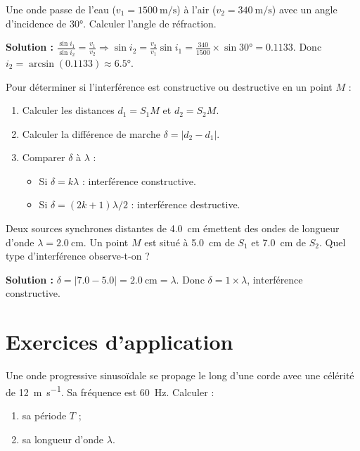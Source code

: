 \begin{exemple}
Une onde passe de l'eau ($v_1 = \SI{1500}{\metre\per\second}$) à l'air ($v_2 = \SI{340}{\metre\per\second}$) avec un angle d'incidence de \ang{30}. Calculer l'angle de réfraction.
\medskip

\textbf{Solution :} $\frac{\sin i_1}{\sin i_2} = \frac{v_1}{v_2} \Rightarrow \sin i_2 = \frac{v_2}{v_1} \sin i_1 = \frac{340}{1500} \times \sin\ang{30} = 0.1133$. Donc $i_2 = \arcsin(0.1133) \approx \ang{6.5}$.
\end{exemple}

Pour déterminer si l'interférence est constructive ou destructive en un point $M$ :
\begin{enumerate}
    \item Calculer les distances $d_1 = S_1M$ et $d_2 = S_2M$.
    \item Calculer la différence de marche $\delta = |d_2 - d_1|$.
    \item Comparer $\delta$ à $\lambda$ :
    \begin{itemize}
        \item Si $\delta = k\lambda$ : interférence constructive.
        \item Si $\delta = (2k+1)\lambda/2$ : interférence destructive.
    \end{itemize}
\end{enumerate}

\begin{exemple}
Deux sources synchrones distantes de \SI{4.0}{\centi\metre} émettent des ondes de longueur d'onde $\lambda = \SI{2.0}{\centi\metre}$. Un point $M$ est situé à \SI{5.0}{\centi\metre} de $S_1$ et \SI{7.0}{\centi\metre} de $S_2$. Quel type d'interférence observe-t-on ?
\medskip

\textbf{Solution :} $\delta = |7.0 - 5.0| = \SI{2.0}{\centi\metre} = \lambda$. Donc $\delta = 1 \times \lambda$, interférence constructive.
\end{exemple}

\section{Exercices d'application}


\exo{} Une onde progressive sinusoïdale se propage le long d'une corde avec une célérité de \SI{12}{\metre\per\second}. Sa fréquence est \SI{60}{\hertz}. Calculer :
\begin{enumerate}
    \item sa période $T$ ;
    \item sa longueur d'onde $\lambda$.
\end{enumerate}

